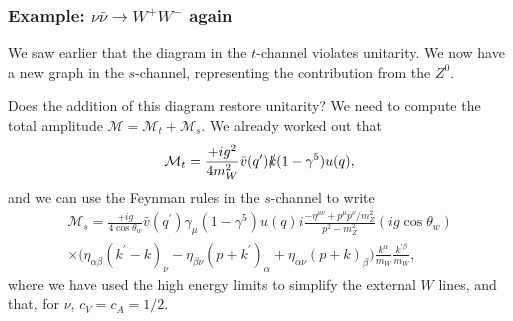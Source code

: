\subsubsection{Example: $\nu \bar{\nu} \to W^+W^-$ again}
%
We saw earlier that the diagram in the $t$-channel violates unitarity. We now have a new graph in the $s$-channel, representing the contribution from the $Z^0$.
\begin{figure}[!h]
  \centering
  \hfill
\end{figure}
Does the addition of this diagram restore unitarity? We need to compute the total amplitude $\mathcal{M} = \mathcal{M}_t + \mathcal{M}_s$. We already worked out that
\begin{equation}
\mathcal{M}_t = \frac{+ig^2}{4m_W^2}\bar{v}(q^\prime)\slashed{k}(1-\gamma^5)u(q),
\end{equation}
and we can use the Feynman rules in the $s$-channel to write
\begin{equation}
\begin{split}
\mathcal{M}_s = \frac{+ig}{4\cos\theta_w}\bar{v}(q^\prime)\gamma_\mu(1-\gamma^5)u(q)i\frac{-\eta^{\mu \nu}+p^\mu p^\nu/m_Z^2}{p^2-m_Z^2}(ig\cos\theta_w) \\
\times \bigg(\eta_{\alpha \beta}(k^\prime - k)_\nu - \eta_{\beta \nu} (p + k^\prime)_\alpha + \eta_{\alpha \nu}(p+k)_\beta \bigg)\frac{k^\alpha}{m_W}\frac{k^{\prime \beta}}{m_W},
\end{split}
\end{equation}
where we have used the high energy limits to simplify the external $W$ lines, and that, for $\nu$, $c_V = c_A = 1/2$.


